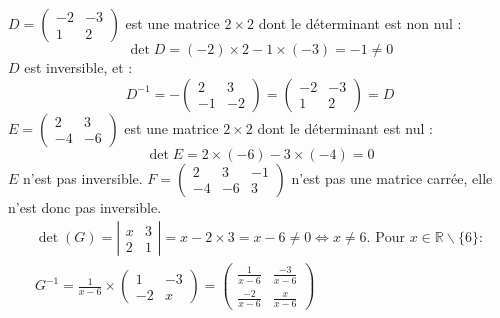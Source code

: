 {$D=\left(\begin{array}{cc}-2 & -3 \\ 1 & 2\end{array}\right)$ est une matrice $2 \times 2$ dont le déterminant est non nul :
$$
\operatorname{det} D=(-2) \times 2-1 \times(-3)=-1 \neq 0
$$
$D$ est inversible, et :
$$
D^{-1}=-\left(\begin{array}{cc}
	2 & 3 \\
	-1 & -2
\end{array}\right)=\left(\begin{array}{cc}
	-2 & -3 \\
	1 & 2
\end{array}\right)=D
$$
$E=\left(\begin{array}{cc}2 & 3 \\ -4 & -6\end{array}\right)$ est une matrice $2 \times 2$ dont le déterminant est nul :
$$
\operatorname{det} E=2 \times(-6)-3 \times(-4)=0
$$
$E$ n'est pas inversible.
$F=\left(\begin{array}{lll}2 & 3 & -1 \\ -4 & -6 & 3\end{array}\right)$ n'est pas une matrice carrée, elle n'est donc pas inversible.
$$
\begin{array}{r}
	\operatorname{det}(G)=\left|\begin{array}{ll}
		x & 3 \\
		2 & 1
	\end{array}\right|=x-2 \times 3=x-6 \neq 0 \Leftrightarrow x \neq 6 . \text { Pour } x \in \mathbb{R} \backslash\{6\}: \\
	G^{-1}=\frac{1}{x-6} \times\left(\begin{array}{cc}
		1 & -3 \\
		-2 & x
	\end{array}\right)=\left(\begin{array}{cc}
		\frac{1}{x-6} & \frac{-3}{x-6} \\
		\frac{-2}{x-6} & \frac{x}{x-6}
	\end{array}\right)
\end{array}
$$ }